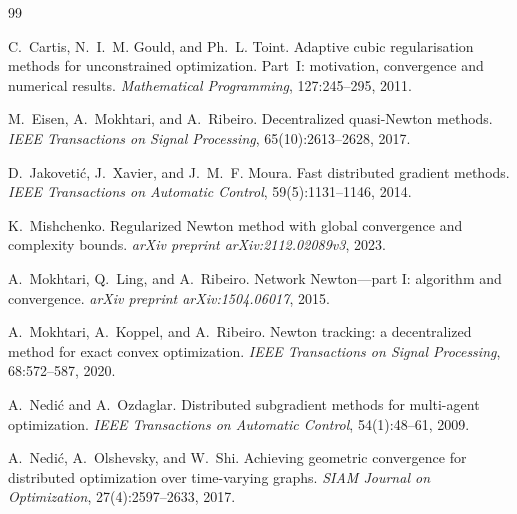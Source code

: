 \documentclass[11pt,a4paper]{article}
\begin{document}
	
	\begin{thebibliography}{99}
		
		C.~Cartis, N.~I.~M. Gould, and Ph.~L. Toint.
		\newblock Adaptive cubic regularisation methods for unconstrained optimization. Part~I: motivation, convergence and numerical results.
		\newblock \emph{Mathematical Programming}, 127:245--295, 2011.
		
		M.~Eisen, A.~Mokhtari, and A.~Ribeiro.
		\newblock Decentralized quasi-{N}ewton methods.
		\newblock \emph{IEEE Transactions on Signal Processing}, 65(10):2613--2628, 2017.
		
		D.~Jakoveti{\'c}, J.~Xavier, and J.~M.~F. Moura.
		\newblock Fast distributed gradient methods.
		\newblock \emph{IEEE Transactions on Automatic Control}, 59(5):1131--1146, 2014.
		
		K.~Mishchenko.
		\newblock Regularized {N}ewton method with global convergence and complexity bounds.
		\newblock \emph{arXiv preprint arXiv:2112.02089v3}, 2023.
		
		A.~Mokhtari, Q.~Ling, and A.~Ribeiro.
		\newblock Network {N}ewton---part {I}: algorithm and convergence.
		\newblock \emph{arXiv preprint arXiv:1504.06017}, 2015.
		
		A.~Mokhtari, A.~Koppel, and A.~Ribeiro.
		\newblock Newton tracking: a decentralized method for exact convex optimization.
		\newblock \emph{IEEE Transactions on Signal Processing}, 68:572--587, 2020.
		
		A.~Nedi{\'c} and A.~Ozdaglar.
		\newblock Distributed subgradient methods for multi-agent optimization.
		\newblock \emph{IEEE Transactions on Automatic Control}, 54(1):48--61, 2009.
		
		A.~Nedi{\'c}, A.~Olshevsky, and W.~Shi.
		\newblock Achieving geometric convergence for distributed optimization over time-varying graphs.
		\newblock \emph{SIAM Journal on Optimization}, 27(4):2597--2633, 2017.
		

\end{thebibliography}
\end{document}
